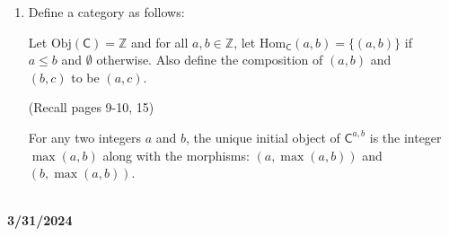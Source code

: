 \documentclass{book}
\newcommand{\hOne}{%
   \color{Black}%
   \fontsize{14}{16}\selectfont%
}
\newcommand{\exP}{%
   \color{VioletRed}%
   \fontsize{12}{14}\selectfont%
}
\newenvironment{myIndent}{%
   \begin{adjustwidth}{2.5em}{0em}%
}{%
   \end{adjustwidth}%
}
\newenvironment{myDindent}{%
   \begin{adjustwidth}{5em}{0em}%
}{%
   \end{adjustwidth}%
}
\newcommand*{\markDate}[1]{%
   {\huge \color{Black} \textbf{#1} \newline}%
}
\newcommand{\myObj}{\mathrm{Obj}}
\newcommand{\myHom}{\mathrm{Hom}}
\newcommand{\mcateg}[1]{{\bm{\mathsf{#1}}}}
\newcommand{\mySepTwo}[1][.]{%
   {\noindent\color{#1}{\rule{6.5in}{0.5mm}}}\\%
}
\newcommand{\retTwo}{\hfill\bigbreak}
\begin{document}
\begin{enumerate}
{\begin{myIndent}
      {\center $\sigma(c) = \left\{
      \begin{matrix}
         f_A(c) & \text{ if } c \text{ came from } A \\
         f_B(c) & \text{ if } c \text{ came from } B
      \end{matrix}\right.$\retTwo \par}

      then the diagram at the top of the next page commutes:

      \newpage

      {\centering
      \par}

      Furthermore, $\sigma$ is the only morphism that works to make the above diagram\\ commute because if any element of $A \amalg B$ is mapped to $Z$ differently, then\\ the above diagram won't commute.\retTwo
   \end{myIndent}}

   \item Define a category as follows:
   \begin{myIndent}
      Let $\myObj(\mcateg{C}) = \mathbb{Z}$ and for all $a, b \in \mathbb{Z}$, let $\myHom_\mcateg{C}(a, b) = \{(a, b)\}$ if\\ $a \leq b$ and $\emptyset$ otherwise. Also define the composition of $(a, b)$ and\\ $(b, c)$ to be $(a, c)$.
      {\begin{myDindent}\exP
         (Recall pages 9-10, 15)\retTwo
      \end{myDindent}}
   \end{myIndent}

   For any two integers $a$ and $b$, the unique initial object of $\mcateg{C}^{a,b}$ is the integer\\ $\max(a, b)$ along with the morphisms: $(a, \max(a, b))$ and $(b, \max(a, b))$.
\end{enumerate}

\hOne
\mySepTwo

\markDate{3/31/2024}
\end{document}
